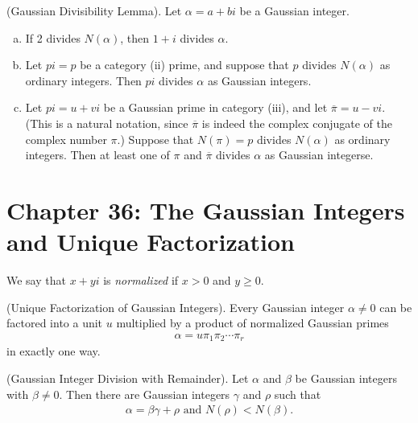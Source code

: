 \documentclass[graybox]{svmult}
\begin{document}
\begin{lemma}
(Gaussian Divisibility Lemma). Let $\alpha = a+bi$ be a Gaussian integer.
\begin{enumerate}[(a)]
\item If 2 divides $N(\alpha)$, then $1+i$ divides $\alpha$.
\item Let $pi=p$ be a category (ii) prime, and suppose that $p$ divides $N(\alpha)$ as ordinary integers. Then $pi$ divides $\alpha$ as Gaussian integers.
\item Let $pi=u+vi$ be a Gaussian prime in category (iii), and let $\overline{\pi} = u-vi$. (This is a natural notation, since $\overline{\pi}$ is indeed the complex conjugate of the complex number $\pi$.) Suppose that $N(\pi)=p$ divides $N(\alpha)$ as ordinary integers. Then at least one of $\pi$ and $\overline{\pi}$ divides $\alpha$ as Gaussian integerse.
\end{enumerate}
\end{lemma}

\section*{Chapter 36: The Gaussian Integers and Unique Factorization}

\begin{definition}
We say that $x+yi$ is \textit{normalized} if $x >0$ and $y\geqslant0$.
\end{definition}

\begin{theorem}
(Unique Factorization of Gaussian Integers). Every Gaussian integer $\alpha \not = 0$ can be factored into a unit $u$ multiplied by a product of normalized Gaussian primes
\begin{align*}
\alpha = u\pi_1\pi_2\cdots\pi_r
\end{align*}
in exactly one way.
\end{theorem}

\begin{theorem}
(Gaussian Integer Division with Remainder). Let $\alpha$ and $\beta$ be Gaussian integers with $\beta \not = 0$. Then there are Gaussian integers $\gamma$ and $\rho$ such that
\begin{align*}
\alpha = \beta\gamma+\rho \text{ and } N(\rho)< N(\beta).
\end{align*}
\end{theorem}
\end{document}
